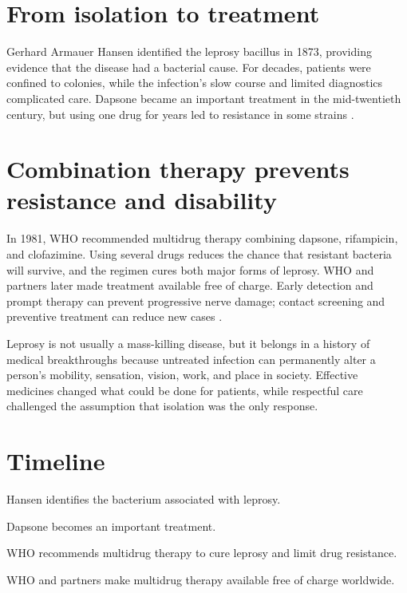 \documentclass[12pt,oneside]{book}
\begin{document}
\section{From isolation to treatment}
Gerhard Armauer Hansen identified the leprosy bacillus in 1873, providing
evidence that the disease had a bacterial cause. For decades, patients were
confined to colonies, while the infection's slow course and limited
diagnostics complicated care. Dapsone became an important treatment in the
mid-twentieth century, but using one drug for years led to resistance in some
strains \cite{whoLeprosyMDT,nhdpLeprosyGuide}.

\section{Combination therapy prevents resistance and disability}
In 1981, WHO recommended multidrug therapy combining dapsone, rifampicin, and
clofazimine. Using several drugs reduces the chance that resistant bacteria
will survive, and the regimen cures both major forms of leprosy. WHO and
partners later made treatment available free of charge. Early detection and
prompt therapy can prevent progressive nerve damage; contact screening and
preventive treatment can reduce new cases \cite{whoLeprosy,whoLeprosyMDT}.

Leprosy is not usually a mass-killing disease, but it belongs in a history of
medical breakthroughs because untreated infection can permanently alter a
person's mobility, sensation, vision, work, and place in society. Effective
medicines changed what could be done for patients, while respectful care
challenged the assumption that isolation was the only response.

\section*{Timeline}
\begin{description}[leftmargin=2.3cm,style=nextline]
  \item[1873] Hansen identifies the bacterium associated with leprosy.
  \item[1940s] Dapsone becomes an important treatment.
  \item[1981] WHO recommends multidrug therapy to cure leprosy and limit drug resistance.
  \item[2000 onward] WHO and partners make multidrug therapy available free of charge worldwide.
\end{description}
\end{document}
